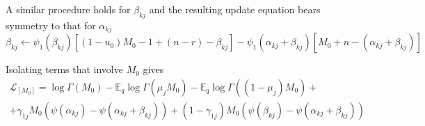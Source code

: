 \documentclass[10pt, letterpaper]{article}
\newcommand{\E}{\mathbb{E}}
\begin{document}
A similar procedure holds for $\beta_{kj}$ and the resulting update equation bears symmetry to that for $\alpha_{kj}$
\begin{equation}
\beta_{kj} \leftarrow \psi_1(\beta_{kj})\left[(1-u_0)M_0-1+(n-r)-\beta_{kj}\right] - \psi_1(\alpha_{kj}+\beta_{kj})\left[M_0+n-(\alpha_{kj}+\beta_{kj})\right]
\end{equation}

Isolating terms that involve $M_0$ gives
\begin{multline}
\mathcal{L}_{[M_0]} = \log \Gamma(M_0) -\E_q\log \Gamma(\mu_jM_0) -\E_q\log \Gamma((1-\mu_j)M_0) +\\
+\gamma_{1j}M_0(\psi(\alpha_{kj})-\psi(\alpha_{kj}+\beta_{kj})) +(1-\gamma_{1j})M_0(\psi(\beta_{kj})-\psi(\alpha_{kj}+\beta_{kj}))
\end{multline}
\end{document}
